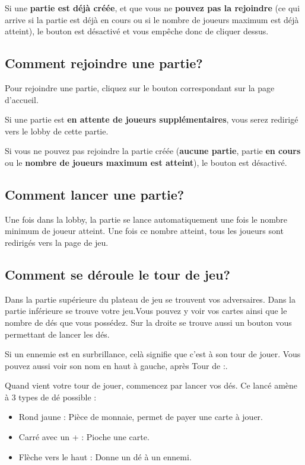\documentclass[11pt]{scrreprt}
\begin{document}
    Si une \textbf{partie est déjà créée}, et que vous ne \textbf{pouvez pas la rejoindre} (ce qui arrive si la partie est déjà en cours ou si le nombre de joueurs maximum est déjà atteint), le bouton est désactivé et vous empêche donc de cliquer dessus.

    \subsection{Comment rejoindre une partie?}
    Pour rejoindre une partie, cliquez sur le bouton correspondant sur la page d'accueil.

    Si une partie est \textbf{en attente de joueurs supplémentaires}, vous serez redirigé vers le lobby de cette partie.

    Si vous ne pouvez pas rejoindre la partie créée (\textbf{aucune partie}, partie \textbf{en cours} ou le \textbf{nombre de joueurs maximum est atteint}), le bouton est désactivé.

    \subsection{Comment lancer une partie?}
    Une fois dans la lobby, la partie se lance automatiquement une fois le nombre minimum de joueur atteint. Une fois ce nombre atteint, tous les joueurs sont redirigés vers la page de jeu.

    \subsection{Comment se déroule le tour de jeu?}
    Dans la partie supérieure du plateau de jeu se trouvent vos adversaires. Dans la partie inférieure se trouve votre jeu.Vous pouvez y voir vos cartes ainsi que le nombre de dés que vous possédez. Sur la droite se trouve aussi un bouton vous permettant de lancer les dés.

    Si un ennemie est en surbrillance, celà signifie que c'est à son tour de jouer. Vous pouvez aussi voir son nom en haut à gauche, après \og Tour de :\fg{}.

    Quand vient votre tour de jouer, commencez par lancer vos dés. Ce lancé amène à 3 types de dé possible :

    \begin{itemize}
        \item Rond jaune : Pièce de monnaie, permet de payer une carte à jouer.
        \item Carré avec un + : Pioche une carte.
        \item Flèche vers le haut : Donne un dé à un ennemi.
    \end{itemize}
\end{document}
